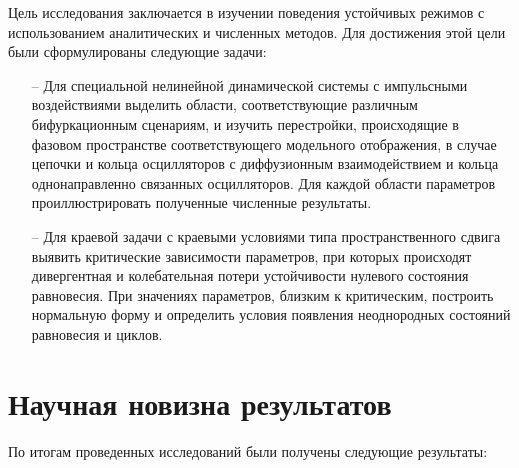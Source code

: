 \documentclass[12pt]{extarticle}
\begin{document}
Цель исследования заключается в изучении поведения устойчивых режимов с использованием аналитических и численных методов. Для достижения этой цели были сформулированы следующие задачи:

\begin{itemize}[leftmargin=1.5\parindent]

\item[--] Для специальной нелинейной динамической системы с импульсными воздействиями выделить области, соответствующие различным бифуркационным сценариям, и изучить перестройки, происходящие в фазовом пространстве соответствующего модельного отображения, в случае цепочки и кольца осцилляторов с диффузионным взаимодействием и кольца однонаправленно связанных осцилляторов. Для каждой области параметров проиллюстрировать полученные численные результаты.
\item[--] Для краевой задачи с краевыми условиями типа пространственного сдвига выявить критические зависимости параметров, при которых происходят дивергентная и колебательная потери устойчивости нулевого состояния равновесия. При значениях параметров, близким к критическим, построить нормальную форму и определить условия появления неоднородных состояний равновесия и циклов.

\end{itemize}

\hspace{0cm}

\hspace{0cm}

\hspace{0cm}

\section*{Научная новизна результатов}

\hspace{0cm}

\hspace{0cm}

\hspace{0cm}

По итогам проведенных исследований были получены следующие результаты:
\end{document}
